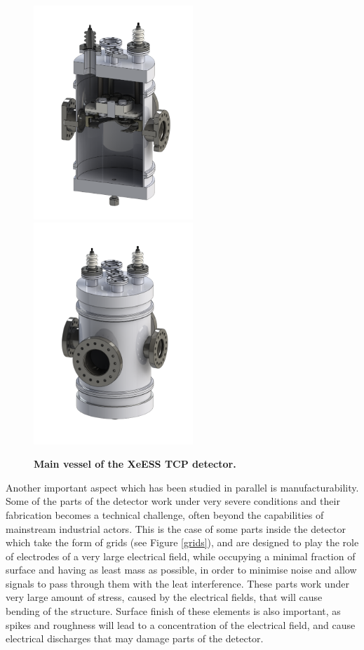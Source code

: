 \documentclass[12pt,a4paper,article]{report} %
\begin{document}
\begin{figure}[htbp]
\begin{center}
\includegraphics[width=6cm]{xeess1}\includegraphics[width=6cm]{xeess2}
\caption{\textbf{Main vessel of the XeESS TCP detector.}}
\label{chamber}
\end{center}
\end{figure}

Another important aspect which has been studied in parallel is manufacturability. Some of the parts of the detector work under very severe conditions and their fabrication becomes a technical challenge, often beyond the capabilities of mainstream industrial actors. This is the case of some parts inside the detector which take the form of grids (see Figure \ref{grids}), and are designed to play the role of electrodes of a very large electrical field, while occupying a minimal fraction of surface and having as least mass as possible, in order to minimise noise and allow signals to pass through them with the leat interference. These parts work under very large amount of stress, caused by the electrical fields, that will cause bending of the structure. Surface finish of these elements is also important, as spikes and roughness will lead to a concentration of the electrical field, and cause electrical discharges that may damage parts of the detector. 
\end{document}
